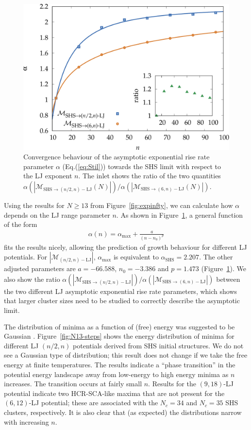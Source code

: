 \begin{figure}
    \centering
    \includegraphics[width=0.8\columnwidth]{kslj/repulsive13-14.pdf}
	\caption{Convergence behaviour of the asymptotic exponential rise rate parameter
	$\alpha$ (Eq.(\ref{eq:Stil})) towards the SHS limit with respect to the LJ exponent $n$. The inlet shows the ratio of
	the two quantities $\alpha(|\mathcal{M}_{\text{SHS}\to (n/2,n)-\text{LJ}}(N)|) /
	\alpha(|\mathcal{M}_{\text{SHS}\to (6,n)-\text{LJ}}(N)|)$.}
    \label{fig:repulsive13-14}
\end{figure}


Using the results for $N \geq 13$ 
from Figure~\ref{fig:expinfty}, we can calculate how $\alpha$ depends on the LJ range parameter $n$.
As shown in Figure~\ref{fig:repulsive13-14}, a general function of the form
\begin{align}
\label{expgrowth}
    \alpha(n)=\alpha_\text{max}+\frac{a}{(n-n_0)^{p}}
\end{align}
fits the results nicely, allowing the prediction of growth behaviour for different
LJ potentials. For $|\mathcal{M}_{(n/2,n)-\text{LJ}}|$, $\alpha_\text{max}$ is
equivalent to $\alpha_\text{SHS}=2.207$. The other adjusted parameters are
$a=-66.588$, $n_0=-3.386$ and $p=1.473$ (Figure~\ref{fig:repulsive13-14}).
We also show the ratio $\alpha(|\mathcal{M}_{\text{SHS}\to (n/2,n)-\text{LJ}}|) /
	\alpha(|\mathcal{M}_{\text{SHS}\to (6,n)-\text{LJ}}|)$ between the two 
	different LJ asymptotic exponential rise rate parameters, which shows that larger
	cluster sizes need to be studied to correctly describe the asymptotic limit. 


The distribution of minima as a function of (free) energy was suggested to be
Gaussian \autocite{Sciortino-1999}.  Figure~\ref{fig:N13-steps} shows the energy
distribution of minima for different LJ $(n/2,n)$ potentials derived from SHS
initial structures. We do not see a Gaussian type of distribution; this 
result does not change if we take the free energy at finite temperatures. 
The results indicate a ``phase transition'' in the potential energy landscape away from low-energy to
high energy minima as $n$ increases.
The transition occurs at fairly small $n$. 
Results for the $(9,18)$-LJ potential indicate two HCR-SCA-like maxima that are not present for the $(6,12)$-LJ potential; these are associated with the $N_c = 34$ and $N_c = 35$ SHS clusters,
respectively.
It is also clear that (as expected) the distributions narrow with increasing $n$.

